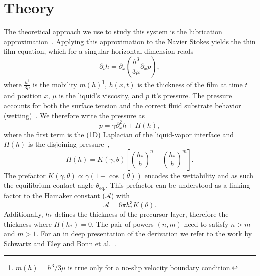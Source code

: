 \documentclass[twocolumn,amsmath,amssymb,showpacs,pre,nofootinbib,superscriptaddress]{revtex4-1} %
\begin{document}
\section{Theory}\label{sec:theory}
The theoretical approach we use to study this system is the lubrication approximation~\cite{Reynolds, RevModPhys.69.931, PhysRevE.63.011208}.
Applying this approximation to the Navier Stokes yields the thin film equation, which for a singular horizontal dimension reads~\cite{RevModPhys.81.739, RevModPhys.81.1131, THIELE2014399}
\begin{equation}\label{eq:thin_film_simple}
    \partial_t h = \partial_x \left(\frac{h^3}{3\mu}\partial_x p\right),
\end{equation}
where $\frac{h^3}{3\mu}$ is the mobility $m(h)$\footnote{$m(h) = h^3/3\mu$ is true only for a no-slip velocity boundary condition.}, $h(x,t)$ is the thickness of the film at time $t$ and position $x$, $\mu$ is the liquid's viscosity, and $p$ it's pressure.
The pressure accounts for both the surface tension and the correct fluid substrate behavior (wetting)~\cite{PhysRevE.100.033313}.
We therefore write the pressure as
\begin{equation}\label{eq:pressure}
    p = \gamma \partial_x^2 h + \Pi(h),
\end{equation}
where the first term is the (1D) Laplacian of the liquid-vapor interface and $\Pi(h)$ is the disjoining pressure~\cite{RevModPhys.69.931, RevModPhys.81.739, Peschka9275, PhysRevE.63.011208},
\begin{equation}\label{eq:disjoin}
    \Pi(h) = K(\gamma,\theta)\left[\left(\frac{h_{\ast}}{h}\right)^n - \left(\frac{h_{\ast}}{h}\right)^m\right].
\end{equation}
The prefactor $K(\gamma,\theta)\propto \gamma(1-\cos(\theta))$ encodes the wettability and as such the equilibrium contact angle $\theta_{\text{eq.}}$.
This prefactor can be understood as a linking factor to the Hamaker constant ($\mathcal{A}$) with~~\cite{PhysRevE.93.013120, bestehorn20033d, van1988interfacial}
\begin{equation}
    \mathcal{A} = 6\pi h_{\ast}^3 K(\theta).    
\end{equation}
Additionally, $h_{\ast}$ defines the thickness of the precursor layer, therefore the thickness where $\Pi(h_{\ast}) = 0$.
The pair of powers $(n,m)$ need to satisfy $n > m$ and $m > 1$.
For an in deep presentation of the derivation we refer to the work by Schwartz and Eley and Bonn et al.~\cite{SCHWARTZ1998173, RevModPhys.81.739}.
\end{document}
